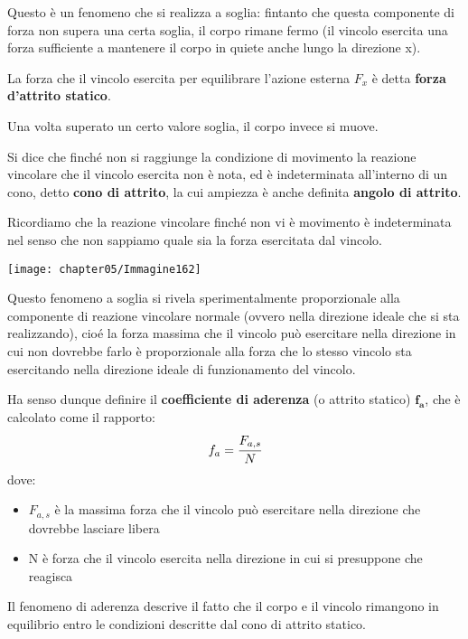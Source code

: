 Questo è un fenomeno che si realizza a soglia: fintanto che questa componente di forza non supera una certa soglia, il corpo rimane fermo (il vincolo esercita una forza sufficiente a mantenere il corpo in quiete anche lungo la direzione x).

\begin{minipage}{.5\textwidth}

La forza che il vincolo esercita per equilibrare l'azione esterna $F_x$ è detta \textbf{forza d'attrito statico}.

Una volta superato un certo valore soglia, il corpo invece si muove.

Si dice che finché non si raggiunge la condizione di movimento la reazione vincolare che il vincolo esercita non è nota, ed è indeterminata all'interno di un cono, detto \textbf{cono di attrito}, la cui ampiezza è anche definita \textbf{angolo di attrito}.

Ricordiamo che la reazione vincolare finché non vi è movimento è indeterminata nel senso che non sappiamo quale sia la forza esercitata dal vincolo.
\end{minipage}
\hfill
\begin{minipage}{.5\textwidth}
\centering
\texttt{[image: chapter05/Immagine162]}
\end{minipage}

Questo fenomeno a soglia si rivela sperimentalmente proporzionale alla componente di reazione vincolare normale (ovvero nella direzione ideale che si sta realizzando), cioé la forza massima che il vincolo può esercitare nella direzione in cui non dovrebbe farlo è proporzionale alla forza che lo stesso vincolo sta esercitando nella direzione ideale di funzionamento del vincolo.

Ha senso dunque definire il \textbf{coefficiente di aderenza} (o attrito statico) $\mathbf{f_a}$, che è calcolato come il rapporto:
\[f_a = \cfrac{F_{a,s}}{N}\]
dove:
\begin{itemize}
\item $F_{a,s}$ è la massima forza che il vincolo può esercitare nella direzione che dovrebbe lasciare libera
\item N è forza che il vincolo esercita nella direzione in cui si presuppone che reagisca
\end{itemize}

Il fenomeno di aderenza descrive il fatto che il corpo e il vincolo rimangono in equilibrio entro le condizioni descritte dal cono di attrito statico.

